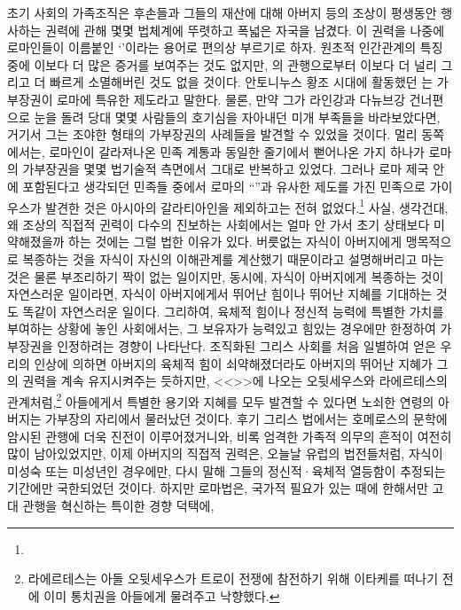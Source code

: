 초기 사회의 가족조직은
후손들과 그들의 재산에 대해
아버지 등의 조상이 평생동안 행사하는 권력에 관해
몇몇 법체계에 뚜렷하고 폭넓은 자국을 남겼다.
이 권력을 나중에 로마인들이 이름붙인
`'이라는 용어로 편의상 부르기로 하자.
원초적 인간관계의 특징 중에 이보다 더 많은 증거를 보여주는 것도 없지만,
의 관행으로부터 이보다 더 널리 그리고 더 빠르게
소멸해버린 것도 없을 것이다.
안토니누스 황조 시대에 활동했던 는
가부장권이 로마에 특유한 제도라고 말한다.
물론, 만약 그가 라인강과 다뉴브강 건너편으로 눈을 돌려
당대 몇몇 사람들의 호기심을 자아내던 미개 부족들을 바라보았다면,
거기서 그는 조야한 형태의 가부장권의 사례들을 발견할 수 있었을 것이다.
멀리 동쪽에서는, 로마인이 갈라져나온 민족 계통과 동일한 줄기에서
뻗어나온 가지 하나가 로마의 가부장권을 몇몇 법기술적 측면에서
그대로 반복하고 있었다.
그러나
로마 제국 안에 포함된다고 생각되던 민족들 중에서
로마의 ``''과 유사한 제도를 가진 민족으로
가이우스가
발견한 것은
아시아의 갈라티아인을 제외하고는
전혀 없었다.\footnote{}
사실, 생각건대,
왜 조상의 직접적 귄력이
다수의 진보하는 사회에서는
얼마 안 가서 초기 상태보다 미약해졌을까 하는 것에는
그럴 법한 이유가 있다.
버릇없는 자식이 아버지에게 맹목적으로 복종하는 것을
자식이 자신의 이해관계를 계산했기 때문이라고 설명해버리고 마는 것은
물론 부조리하기 짝이 없는 일이지만,
동시에, 자식이 아버지에게 복종하는 것이 자연스러운 일이라면,
자식이 아버지에게서 뛰어난 힘이나 뛰어난 지혜를 기대하는 것도 똑같이
자연스러운 일이다.
그리하여,
육체적 힘이나 정신적 능력에 특별한 가치를 부여하는 상황에 놓인 사회에서는,
그 보유자가 능력있고 힘있는 경우에만 한정하여
가부장권을
인정하려는 경향이 나타난다.
조직화된 그리스 사회를 처음 일별하여 얻은 우리의 인상에 의하면
아버지의 육체적 힘이 쇠약해졌더라도 아버지의 뛰어난 지혜가
그의 권력을 계속 유지시켜주는 듯하지만,
<<>>에 나오는
오뒷세우스와 라에르테스의 관계처럼,\footnote{%
  라에르테스는 아들 오뒷세우스가 트로이 전쟁에 참전하기 위해
  이타케를 떠나기 전에 이미 통치권을 아들에게 물려주고 낙향했다.}
아들에게서 특별한 용기와 지혜를 모두 발견할 수 있다면
노쇠한 연령의 아버지는 가부장의 자리에서 물러났던 것이다.
후기 그리스 법에서는
호메로스의 문학에 암시된 관행에 더욱 진전이 이루어졌거니와,
비록 엄격한 가족적 의무의 흔적이 여전히 많이 남아있었지만,
이제 아버지의 직접적 권력은, 오늘날 유럽의 법전들처럼,
자식이 미성숙 또는 미성년인 경우에만, 다시 말해 그들의 정신적^^b7육체적
열등함이 추정되는 기간에만 국한되었던 것이다.
하지만 로마법은,
국가적 필요가 있는 때에 한해서만 고대 관행을 혁신하는 특이한 경향 덕택에,
